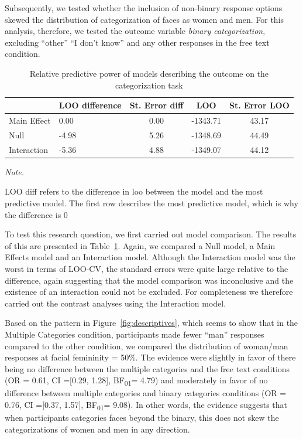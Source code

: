 \documentclass[
  man]{apa7}
\begin{document}
Subsequently, we tested whether the inclusion of non-binary response options skewed the distribution of categorization of faces as women and men. For this analysis, therefore, we tested the outcome variable \emph{binary categorization}, excluding ``other'' ``I don't know'' and any other responses in the free text condition.

\begin{table}

\caption{\label{tab:rq2-table}Relative predictive power of models describing the outcome on the categorization task}
\centering
\begin{threeparttable}
\begin{tabular}[t]{llccc}
\toprule
  & LOO difference & St. Error diff & LOO & St. Error LOO\\
\midrule
Main Effect & 0.00 & 0.00 & -1343.71 & 43.17\\
Null & -4.98 & 5.26 & -1348.69 & 44.49\\
Interaction & -5.36 & 4.88 & -1349.07 & 44.12\\
\bottomrule
\end{tabular}
\begin{tablenotes}[para]
\item \textit{Note.} 
\item LOO diff refers to the difference in loo between the model and the most predictive model. The first row describes the most predictive model, which is why the difference is 0
\end{tablenotes}
\end{threeparttable}
\end{table}

To test this research question, we first carried out model comparison. The results of this are presented in Table~\ref{tab:rq2-table}. Again, we compared a Null model, a Main Effects model and an Interaction model. Although the Interaction model was the worst in terms of LOO-CV, the standard errors were quite large relative to the difference, again suggesting that the model comparison was inconclusive and the existence of an interaction could not be excluded. For completeness we therefore carried out the contrast analyses using the Interaction model.

Based on the pattern in Figure~\ref{fig:descriptives}, which seems to show that in the Multiple Categories condition, participants made fewer ``man'' responses compared to the other condition, we compared the distribution of woman/man responses at facial femininity = 50\%. The evidence were slightly in favor of there being no difference between the multiple categories and the free text conditions (OR = 0.61, CI ={[}0.29, 1.28{]}, BF\textsubscript{01}= 4.79) and moderately in favor of no difference between multiple categories and binary categories conditions (OR = 0.76, CI ={[}0.37, 1.57{]}, BF\textsubscript{01}= 9.08). In other words, the evidence suggests that when participants categories faces beyond the binary, this does not skew the categorizations of women and men in any direction.
\end{document}

